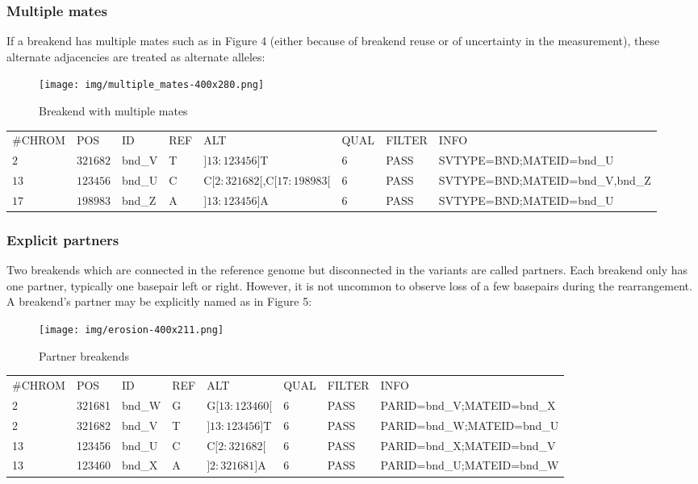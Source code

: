 \documentclass[8pt]{article}
\begin{document}
\subsubsection{Multiple mates}
If a breakend has multiple mates such as in Figure 4 (either because of breakend reuse or of uncertainty in the measurement), these alternate adjacencies are treated as alternate alleles:

\begin{figure}[h]
\centering
\texttt{[image: img/multiple\_mates-400x280.png]}
\caption{Breakend with multiple mates}
\end{figure}

\footnotesize
\begin{tabular}{ l l l l l l l l }
\#CHROM & POS & ID & REF & ALT & QUAL & FILTER & INFO \\
$2$ & $321682$ & bnd\_V & T & $]13:123456]$T & 6 & PASS & SVTYPE=BND;MATEID=bnd\_U \\
$13$ & $123456$ & bnd\_U & C & C$[2:321682[$,C$[17:198983[$ & 6 & PASS & SVTYPE=BND;MATEID=bnd\_V,bnd\_Z \\
$17$ & $198983$ & bnd\_Z & A & $]13:123456]$A & 6 & PASS & SVTYPE=BND;MATEID=bnd\_U \\
\end{tabular}
\normalsize

\subsubsection{Explicit partners}
Two breakends which are connected in the reference genome but disconnected in the variants are called partners. Each breakend only has one partner, typically one basepair left or right. However, it is not uncommon to observe loss of a few basepairs during the rearrangement. A breakend's partner may be explicitly named as in Figure 5:

\begin{figure}[ht]
\centering
\texttt{[image: img/erosion-400x211.png]}
\caption{Partner breakends}
\end{figure}

\small
\begin{tabular}{ l l l l l l l l }
\#CHROM & POS & ID & REF & ALT & QUAL & FILTER & INFO \\
2 & 321681 & bnd\_W & G & G$[13:123460[$ & 6 & PASS & PARID=bnd\_V;MATEID=bnd\_X \\
2 & 321682 & bnd\_V & T & $]13:123456]$T & 6 & PASS & PARID=bnd\_W;MATEID=bnd\_U \\
13 & 123456 & bnd\_U & C & C$[2:321682[$ & 6 & PASS &  PARID=bnd\_X;MATEID=bnd\_V \\
13 & 123460 & bnd\_X & A & $]2:321681]$A & 6 & PASS &  PARID=bnd\_U;MATEID=bnd\_W \\
\end{tabular}
\normalsize
\end{document}
